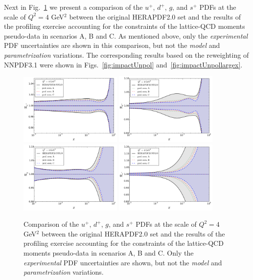 Next in Fig.~\ref{fig:pdfsProf} we present a
comparison of the
$u^+$, $d^+$, $g$, and $s^+$ PDFs at the scale of $Q^2=4$ GeV$^2$
between the original  HERAPDF2.0 set and the results of the profiling
exercise accounting for the constraints of
the lattice-QCD moments
pseudo-data in scenarios A, B and C.
%
As mentioned above, only the {\it experimental} PDF uncertainties are shown
in this comparison,
but not the {\it model} and {\it parametrization} variations.
%
The corresponding results based on the reweighting
of NNPDF3.1 were shown in Figs.~\ref{fig:impactUnpol}
and~\ref{fig:impactUnpollargex}.

\begin{figure}[!t]
\centering
\includegraphics[width=0.45\textwidth]{plots/ratio_uPubar_Q2.pdf}
\includegraphics[width=0.45\textwidth]{plots/ratio_dPdbar_Q2.pdf}\\
\includegraphics[width=0.45\textwidth]{plots/ratio_g_Q2.pdf}
\includegraphics[width=0.45\textwidth]{plots/ratio_sPsbar_Q2.pdf}
\caption{\small Comparison
of the $u^+$, $d^+$, $g$, and $s^+$ PDFs at the scale of $Q^2=4$ GeV$^2$
between the original  HERAPDF2.0 set and the results of the profiling
exercise accounting for the constraints of
the lattice-QCD moments
pseudo-data in scenarios A, B and C.
%
Only the {\it experimental} PDF uncertainties are shown,
but not the {\it model} and {\it parametrization} variations.
}
\label{fig:pdfsProf}
\end{figure}

